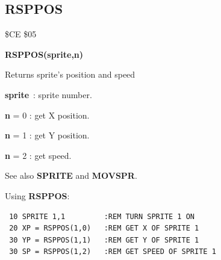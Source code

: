 
\newpage
\subsection{RSPPOS}
\begin{description}[leftmargin=2cm,style=nextline]
\item [Token:] \$CE \$05
\item [Format:] {\bf RSPPOS(sprite,n)}
\item [Usage:]  Returns sprite's position and speed

                {\bf sprite} : sprite number.

                {\bf n} = 0 : get X position.

                {\bf n} = 1 : get Y position.

                {\bf n} = 2 : get speed.


\item [Remarks:] See also {\bf SPRITE} and {\bf MOVSPR}.

\item [Example:] Using {\bf RSPPOS}:
\begin{tcolorbox}[colback=black,coltext=white]
\verbatimfont{\codefont}
\begin{verbatim}
 10 SPRITE 1,1         :REM TURN SPRITE 1 ON
 20 XP = RSPPOS(1,0)   :REM GET X OF SPRITE 1
 30 YP = RSPPOS(1,1)   :REM GET Y OF SPRITE 1
 30 SP = RSPPOS(1,2)   :REM GET SPEED OF SPRITE 1
\end{verbatim}
\end{tcolorbox}
\end{description}


\newpage
